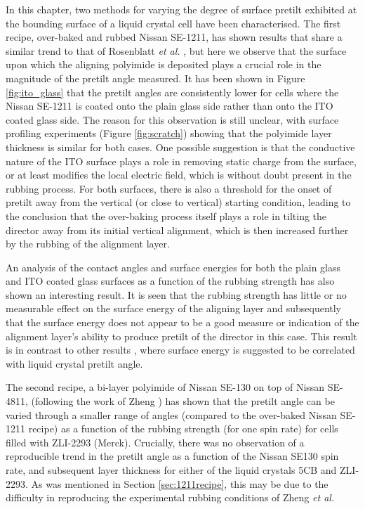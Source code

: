 In this chapter, two methods for varying the degree of surface pretilt exhibited at the bounding surface of a liquid crystal cell have been characterised. The first recipe, over-baked and rubbed Nissan SE-1211, has shown results that share a similar trend to that of Rosenblatt \textit{et al.} \cite{Wang2007,Huang2005}, but here we observe that the surface upon which the aligning polyimide is deposited plays a crucial role in the magnitude of the pretilt angle measured. It has been shown in Figure \ref{fig:ito_glass} that the pretilt angles are consistently lower for cells where the Nissan SE-1211 is coated onto the plain glass side rather than onto the ITO coated glass side. The reason for this observation is still unclear, with surface profiling experiments (Figure \ref{fig:scratch}) showing that the polyimide layer thickness is similar for both cases. One possible suggestion is that the conductive nature of the ITO surface plays a role in removing static charge from the surface, or at least modifies the local electric field, which is without doubt present in the rubbing process. For both surfaces, there is also a threshold for the onset of pretilt away from the vertical (or close to vertical) starting condition, leading to the conclusion that the over-baking process itself plays a role in tilting the director away from its initial vertical alignment, which is then increased further by the rubbing of the alignment layer.
 
An analysis of the contact angles and surface energies for both the plain glass and ITO coated glass surfaces as a function of the rubbing strength has also shown an interesting result. It is seen that the rubbing strength has little or no measurable effect on the surface energy of the aligning layer and subsequently that the surface energy does not appear to be a good measure or indication of the alignment layer's ability to produce pretilt of the director in this case. This result is in contrast to other results \cite{Hwang2010}, where surface energy is suggested to be correlated with liquid crystal pretilt angle.

The second recipe, a bi-layer polyimide of Nissan SE-130 on top of Nissan SE-4811, (following the work of Zheng  \cite{Zheng2007}) has shown that the pretilt angle can be varied through a smaller range of angles (compared to the over-baked Nissan SE-1211 recipe) as a function of the rubbing strength (for one spin rate) for cells filled with ZLI-2293 (Merck). Crucially, there was no observation of a reproducible trend in the pretilt angle as a function of the Nissan SE130 spin rate, and subsequent layer thickness for either of the liquid crystals 5CB and ZLI-2293. As was mentioned in Section \ref{sec:1211recipe}, this may be due to the difficulty in reproducing the experimental rubbing conditions of Zheng \textit{et al.}
